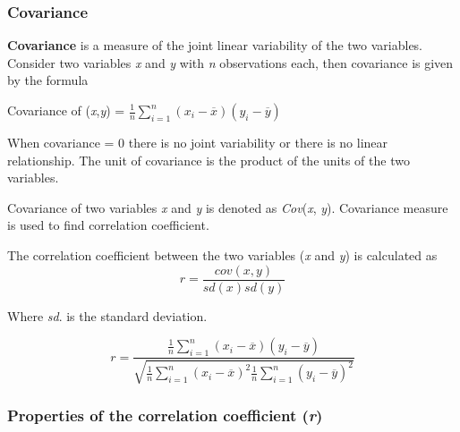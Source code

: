 \documentclass[
]{book}
\begin{document}
\hypertarget{covariance}{%
\subsubsection{Covariance}\label{covariance}}

\textbf{Covariance} is a measure of the joint linear variability of the two
variables. Consider two variables \emph{x} and \emph{y} with \emph{n} observations
each, then covariance is given by the formula

Covariance of (\emph{x},\emph{y}) =
\(\frac{1}{n}\sum_{i = 1}^{n}{\left( x_{i} - \overline{x} \right)\left( y_{i} - \overline{y} \right)}\)

When covariance = 0 there is no joint variability or there is no linear
relationship. The unit of covariance is the product of the units of the
two variables.

Covariance of two variables \emph{x} and \emph{y} is denoted as \emph{Cov}(\emph{x}, \emph{y}).
Covariance measure is used to find correlation coefficient.

The correlation coefficient between the two variables (\emph{x} and \emph{y}) is
calculated as\\
\[r=\frac{cov(x,y)}{sd(x)sd(y)}\]

Where \emph{sd}. is the standard deviation.

\[r = \frac{\frac{1}{n}\sum_{i = 1}^{n}{\left( x_{i} - \overline{x} \right)\left( y_{i} - \overline{y} \right)}}{\sqrt{\frac{1}{n}\sum_{i = 1}^{n}\left( x_{i} - \overline{x} \right)^{2}\frac{1}{n}\sum_{i = 1}^{n}\left( y_{i} - \overline{y} \right)^{2}}}\]

\hypertarget{properties-of-the-correlation-coefficient-r}{%
\subsubsection{\texorpdfstring{Properties of the correlation coefficient (\emph{r})}{Properties of the correlation coefficient (r)}}\label{properties-of-the-correlation-coefficient-r}}
\end{document}

